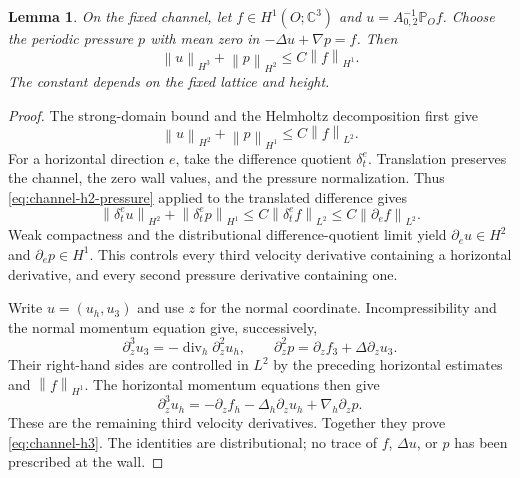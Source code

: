 \documentclass[11pt]{article}
\numberwithin{equation}{section}
\newtheorem{lemma}[theorem]{Lemma}
\theoremstyle{remark}
\newcommand{\C}{\mathbb C}
\newcommand{\PP}{\mathbb P}
\newcommand{\divg}{\operatorname{div}}
\newcommand{\norm}[1]{\left\lVert#1\right\rVert}
\begin{document}
\begin{lemma}\label{lem:channel-extra-derivative}
On the fixed channel, let $f\in H^1(O;\C^3)$ and
$u=A_{0,2}^{-1}\PP_Of$. Choose the periodic pressure $p$ with mean
zero in $-\Delta u+\nabla p=f$. Then
\begin{equation}\label{eq:channel-h3}
 \norm{u}_{H^3}+\norm{p}_{H^2}\leq C\norm{f}_{H^1}.
\end{equation}
The constant depends on the fixed lattice and height.
\end{lemma}
\begin{proof}
The strong-domain bound and the Helmholtz decomposition first give
\begin{equation}\label{eq:channel-h2-pressure}
 \norm{u}_{H^2}+\norm{p}_{H^1}\leq C\norm{f}_{L^2}.
\end{equation}
For a horizontal direction $e$, take the difference quotient
$\delta_t^e$. Translation preserves the channel, the zero wall values,
and the pressure normalization. Thus \eqref{eq:channel-h2-pressure}
applied to the translated difference gives
\[
 \norm{\delta_t^e u}_{H^2}+\norm{\delta_t^e p}_{H^1}
 \leq C\norm{\delta_t^e f}_{L^2}
 \leq C\norm{\partial_e f}_{L^2}.
\]
Weak compactness and the distributional difference-quotient limit yield
$\partial_eu\in H^2$ and $\partial_ep\in H^1$. This controls every
third velocity derivative containing a horizontal derivative, and every
second pressure derivative containing one.

Write $u=(u_h,u_3)$ and use $z$ for the normal coordinate.
Incompressibility and the normal momentum equation give, successively,
\begin{equation}\label{eq:channel-normal-reconstruction}
 \partial_z^3u_3=-\divg_h\partial_z^2u_h,\qquad
 \partial_z^2p=\partial_zf_3+\Delta\partial_zu_3.
\end{equation}
Their right-hand sides are controlled in $L^2$ by the preceding
horizontal estimates and $\norm{f}_{H^1}$. The horizontal momentum
equations then give
\[
 \partial_z^3u_h=-\partial_zf_h-\Delta_h\partial_zu_h
                         +\nabla_h\partial_zp.
\]
These are the remaining third velocity derivatives. Together they
prove \eqref{eq:channel-h3}. The identities are distributional;
no trace of $f$, $\Delta u$, or $p$ has been prescribed at the wall.
\end{proof}
\end{document}

